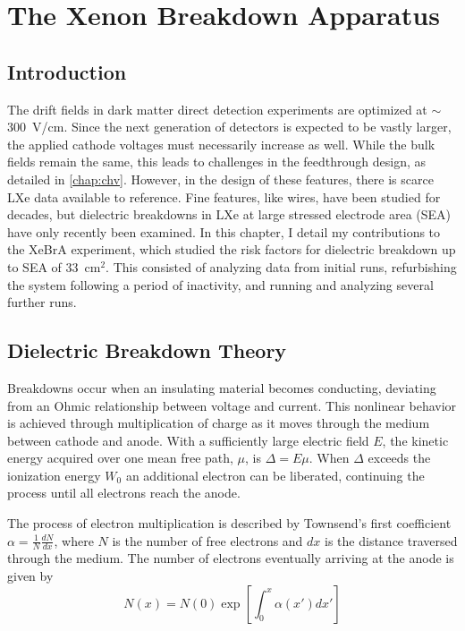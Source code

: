\chapter{The Xenon Breakdown Apparatus}
\label{chap:xebra}
\section{Introduction}
The drift fields in dark matter direct detection experiments are optimized at $\sim$300~V/cm.
Since the next generation of detectors is expected to be vastly larger, the applied cathode voltages must necessarily increase as well.
While the bulk fields remain the same, this leads to challenges in the feedthrough design, as detailed in \ref{chap:chv}.
However, in the design of these features, there is scarce LXe data available to reference.
Fine features, like wires, have been studied for decades, but dielectric breakdowns in LXe at large stressed electrode area (SEA) have only recently been examined\cite{tvrznikova_direct_2019, tvrznikova_sub-gev_2019}.
In this chapter, I detail my contributions to the XeBrA experiment, which studied the risk factors for dielectric breakdown up to SEA of 33~cm$^2$.
This consisted of analyzing data from initial runs, refurbishing the system following a period of inactivity, and running and analyzing several further runs.

\section{Dielectric Breakdown Theory}
Breakdowns occur when an insulating material becomes conducting, deviating from an Ohmic relationship between voltage and current.
This nonlinear behavior is achieved through multiplication of charge as it moves through the medium between cathode and anode.
With a sufficiently large electric field $E$, the kinetic energy acquired over one mean free path, $\mu$, is $\Delta = E\mu$.
When $\Delta$ exceeds the ionization energy $W_0$ an additional electron can be liberated, continuing the process until all electrons reach the anode.

The process of electron multiplication is described by Townsend's first coefficient $\alpha = \frac{1}{N}\frac{dN}{dx}$, where $N$ is the number of free electrons and $dx$ is the distance traversed through the medium.
The number of electrons eventually arriving at the anode is given by \begin{equation}
    N(x) = N(0) \exp [\int_0^x \alpha(x') dx']
\end{equation}

